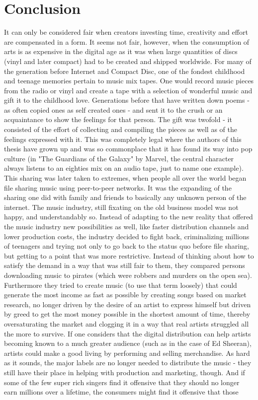 \documentclass[a4paper]{report}
\begin{document}
\chapter{Conclusion}
\label{ch:Concl}
It can only be considered fair when creators investing time, creativity and effort are compensated in a form. It seems not fair, however, when the consumption of arts is as expensive in the digital age as it was when large quantities of discs (vinyl and later compact) had to be created and shipped worldwide. For many of the generation before Internet and Compact Disc, one of the fondest childhood and teenage memories pertain to music mix tapes. One would record music pieces from the radio or vinyl and create a tape with a selection of wonderful music and gift it to the childhood love. Generations before that have written down poems - as often copied ones as self created ones - and sent it to the crush or an acquaintance to show the feelings for that person. The gift was twofold - it consisted of the effort of collecting and compiling the pieces as well as of the feelings expressed with it. This was completely legal where the authors of this thesis have grown up and was so commonplace that it has found its way into pop culture (in "The Guardians of the Galaxy" by Marvel, the central character always listens to an eighties mix on an audio tape, just to name one example). This sharing was later taken to extremes, when people all over the world began file sharing music using peer-to-peer networks. It was the expanding of the sharing one did with family and friends to basically any unknown person of the internet. The music industry, still fixating on the old business model was not happy, and understandably so. Instead of adapting to the new reality that offered the music industry new possibilities as well, like faster distribution channels and lower production costs, the industry decided to fight back, criminalizing millions of teenagers and trying not only to go back to the status quo before file sharing, but getting to a point that was more restrictive. Instead of thinking about how to satisfy the demand in a way that was still fair to them, they compared persons downloading music to pirates (which were robbers and murders on the open sea). Furthermore they tried to create music (to use that term loosely) that could generate the most income as fast as possible by creating songs based on market research, no longer driven by the desire of an artist to express himself but driven by greed to get the most money possible in the shortest amount of time, thereby oversaturating the market and clogging it in a way that real artists struggled all the more to survive. If one considers that the digital distribution can help artists becoming known to a much greater audience (such as in the case of Ed Sheeran), artists could make a good living by performing and selling merchandise. As hard as it sounds, the major labels are no longer needed to distribute the music - they still have their place in helping with production and marketing, though. And if some of the few super rich singers find it offensive that they should no longer earn millions over a lifetime, the consumers might find it offensive that those 
\end{document}
